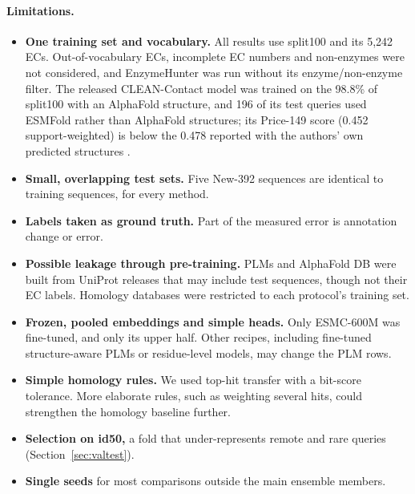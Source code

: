 \documentclass[11pt]{article}
\begin{document}
\paragraph{Limitations.}
\begin{itemize}
  \item \textbf{One training set and vocabulary.} All results use split100 and its 5,242 ECs. Out-of-vocabulary ECs,
        incomplete EC numbers and non-enzymes were not considered, and EnzymeHunter was run without its
        enzyme/non-enzyme filter. The released CLEAN-Contact model was trained on the 98.8\% of split100 with an
        AlphaFold structure, and 196 of its test queries used ESMFold rather than AlphaFold structures; its Price-149
        score (0.452 support-weighted) is below the 0.478 reported with the authors' own predicted structures
        \cite{milbc}.
  \item \textbf{Small, overlapping test sets.} Five New-392 sequences are identical to training sequences, for every
        method.
  \item \textbf{Labels taken as ground truth.} Part of the measured error is annotation change or error.
  \item \textbf{Possible leakage through pre-training.} PLMs and AlphaFold DB were built from UniProt releases that may
        include test sequences, though not their EC labels. Homology databases were restricted to each protocol's
        training set.
  \item \textbf{Frozen, pooled embeddings and simple heads.} Only ESMC-600M was fine-tuned, and only its upper half.
        Other recipes, including fine-tuned structure-aware PLMs or residue-level models, may change the PLM rows.
  \item \textbf{Simple homology rules.} We used top-hit transfer with a bit-score tolerance. More elaborate rules, such
        as weighting several hits, could strengthen the homology baseline further.
  \item \textbf{Selection on id50,} a fold that under-represents remote and rare queries (Section~\ref{sec:valtest}).
  \item \textbf{Single seeds} for most comparisons outside the main ensemble members.
\end{itemize}
\end{document}
